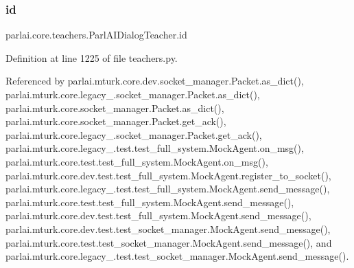 \mbox{\label{classparlai_1_1core_1_1teachers_1_1ParlAIDialogTeacher_a07870e07e8e6f708974ac9f51600e4fa}} 
\subsubsection{\texorpdfstring{id}{id}}
{\footnotesize\ttfamily parlai.\+core.\+teachers.\+Parl\+A\+I\+Dialog\+Teacher.\+id}



Definition at line 1225 of file teachers.\+py.



Referenced by parlai.\+mturk.\+core.\+dev.\+socket\+\_\+manager.\+Packet.\+as\+\_\+dict(), parlai.\+mturk.\+core.\+legacy\+\_.\+socket\+\_\+manager.\+Packet.\+as\+\_\+dict(), parlai.\+mturk.\+core.\+socket\+\_\+manager.\+Packet.\+as\+\_\+dict(), parlai.\+mturk.\+core.\+socket\+\_\+manager.\+Packet.\+get\+\_\+ack(), parlai.\+mturk.\+core.\+legacy\+\_.\+socket\+\_\+manager.\+Packet.\+get\+\_\+ack(), parlai.\+mturk.\+core.\+legacy\+\_.\+test.\+test\+\_\+full\+\_\+system.\+Mock\+Agent.\+on\+\_\+msg(), parlai.\+mturk.\+core.\+test.\+test\+\_\+full\+\_\+system.\+Mock\+Agent.\+on\+\_\+msg(), parlai.\+mturk.\+core.\+dev.\+test.\+test\+\_\+full\+\_\+system.\+Mock\+Agent.\+register\+\_\+to\+\_\+socket(), parlai.\+mturk.\+core.\+legacy\+\_.\+test.\+test\+\_\+full\+\_\+system.\+Mock\+Agent.\+send\+\_\+message(), parlai.\+mturk.\+core.\+test.\+test\+\_\+full\+\_\+system.\+Mock\+Agent.\+send\+\_\+message(), parlai.\+mturk.\+core.\+dev.\+test.\+test\+\_\+full\+\_\+system.\+Mock\+Agent.\+send\+\_\+message(), parlai.\+mturk.\+core.\+dev.\+test.\+test\+\_\+socket\+\_\+manager.\+Mock\+Agent.\+send\+\_\+message(), parlai.\+mturk.\+core.\+test.\+test\+\_\+socket\+\_\+manager.\+Mock\+Agent.\+send\+\_\+message(), and parlai.\+mturk.\+core.\+legacy\+\_.\+test.\+test\+\_\+socket\+\_\+manager.\+Mock\+Agent.\+send\+\_\+message().

\mbox{\label{classparlai_1_1core_1_1teachers_1_1ParlAIDialogTeacher_accef414b3b1e708e7dd71a3e1871261f}} 
